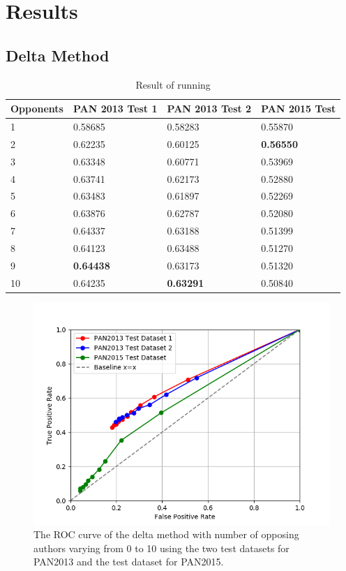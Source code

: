 \section{Results}

\subsection{Delta Method}
\begin{table}
    \begin{tabular}{l|lll}
        \textbf{Opponents} & \textbf{PAN 2013 Test 1} & \textbf{PAN 2013 Test 2}
        & \textbf{PAN 2015 Test} \\ \hline
        1  & 0.58685 & 0.58283 & 0.55870 \\
        2  & 0.62235 & 0.60125 & \textbf{0.56550} \\
        3  & 0.63348 & 0.60771 & 0.53969 \\
        4  & 0.63741 & 0.62173 & 0.52880 \\
        5  & 0.63483 & 0.61897 & 0.52269 \\
        6  & 0.63876 & 0.62787 & 0.52080 \\
        7  & 0.64337 & 0.63188 & 0.51399 \\
        8  & 0.64123 & 0.63488 & 0.51270 \\
        9  & \textbf{0.64438} & 0.63173 & 0.51320 \\
        10 & 0.64235 & \textbf{0.63291} & 0.50840
    \end{tabular}
    \caption{Result of running}
    \label{tab:delta_method_final_results}
\end{table}

\begin{figure}
    \centering
    \includegraphics[width=.7\textwidth]{./pictures/delta_method_roc.png}
    \caption{The ROC curve of the delta method with number of opposing authors
    varying from 0 to 10 using the two test datasets for PAN2013 and the test
    dataset for PAN2015.}
    \label{fig:delta_method_roc}
\end{figure}

